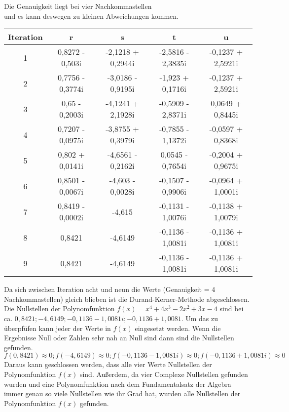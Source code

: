 \documentclass[12pt]{article}
\begin{document}
        
        \begin{center}
        Die Genauigkeit liegt bei vier Nachkommastellen \\ und es kann deswegen zu kleinen Abweichungen kommen.
        \begin{tabular}{c|c c c c}
            Iteration & r & s & t & u \\
            \hline
            1 & 0,8272 - 0,503i & -2,1218 + 0,2944i & -2,5816 - 2,3835i & -0,1237 + 2,5921i \\
            2 & 0,7756 - 0,3774i & -3,0186 - 0,9195i & -1,923 + 0,1716i & -0,1237 + 2,5921i \\
            3 & 0,65 - 0,2003i & -4,1241 + 2,1928i & -0,5909 - 2,8371i & 0,0649 + 0,8445i \\
            4 & 0,7207 - 0,0975i & -3,8755 + 0,3979i & -0,7855 - 1,1372i & -0,0597 + 0,8368i \\
            5 & 0,802 + 0,0141i & -4,6561 - 0,2162i & 0,0545 - 0,7654i & -0,2004 + 0,9675i \\
            6 & 0,8501 - 0,0067i & -4,603 - 0,0028i & -0,1507 - 0,9906i & -0,0964 + 1,0001i \\
            7 & 0,8419 - 0,0002i & -4,615 & -0,1131 - 1,0076i & -0,1138 + 1,0079i \\
            8 & 0,8421 & -4,6149 & -0,1136 - 1,0081i & -0,1136 + 1,0081i \\
            9 & 0,8421 & -4,6149 & -0,1136 - 1,0081i & -0,1136 + 1,0081i \\
        \end{tabular}
        \end{center}
        Da sich zwischen Iteration acht und neun die Werte (Genauigkeit = 4 Nachkommastellen) gleich blieben ist die Durand-Kerner-Methode abgeschlossen. Die Nullstellen der Polynomfunktion $f(x) = x^4 + 4x^3 - 2x^2 + 3x - 4$ sind bei ca. $0,8421; -4,6149; -0,1136 - 1,0081i; -0,1136 + 1,0081$. Um das zu überpfüfen kann jeder der Werte in $f(x)$ eingesetzt werden. Wenn die Ergebnisse Null oder Zahlen sehr nah an Null sind dann sind die Nullstellen gefunden.
        \begin{displaymath}
            f(0,8421) \approx 0; f(-4,6149) \approx 0; f(-0,1136 - 1,0081i) \approx 0; f(-0,1136 + 1,0081i) \approx 0
        \end{displaymath}
        Daraus kann geschlossen werden, dass alle vier Werte Nullstellen der Polynomfunktion $f(x)$ sind. Außerdem, da vier Complexe Nullstellen gefunden wurden und eine Polynomfunktion nach dem Fundamentalsatz der Algebra immer genau so viele Nullstellen wie ihr Grad hat, wurden alle Nullstellen der Polynomfunktion $f(x)$ gefunden.
        
\end{document}
